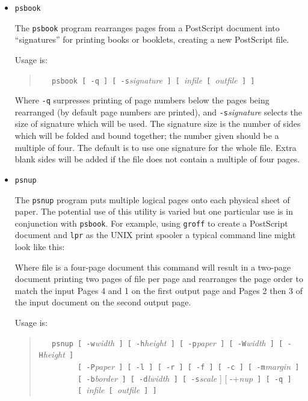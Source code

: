 \documentclass[twoside,11pt]{starlink}
\begin{document}
\begin{itemize}

\item \texttt{psbook}

The \texttt{psbook} program rearranges pages from a PostScript document
into ``signatures'' for printing books or booklets, creating a new
PostScript file.

Usage is:

\begin{quote}
\verb+   psbook [ -q ] [ -s+\emph{signature}\verb+ ] [ +\emph{infile}\verb+ [ +\emph{outfile}\verb+ ] ]+
\end{quote}

Where \texttt{-q} surpresses printing of page numbers below the pages
being rearranged (by default page numbers are printed), and \texttt{-s}\emph{signature} selects the size of signature which will be used.
The signature size is the number of sides which will be folded and
bound together; the number given should be a multiple of four. The
default is to use one signature for the whole file. Extra blank sides
will be added if the file does not contain a multiple of four pages.

\item \texttt{psnup}

The \texttt{psnup} program puts multiple logical pages onto each physical
sheet of paper. The potential use of this utility is varied but one
particular use is in conjunction with \texttt{psbook}. For example, using
\texttt{groff} to create a PostScript document and \texttt{lpr} as the UNIX
print spooler a typical command line might look like this:

\begin{terminalv}
\end{terminalv}

Where file is a four-page document this command will result in a
two-page document printing two pages of file per page and rearranges
the page order to match the input Pages 4 and 1 on the first output
page and Pages 2 then 3 of the input document on the second output
page.

Usage is:

\begin{quote}
\verb+   psnup [ -w+\emph{width}\verb+ ] [ -h+\emph{height}\verb+ ] [ -p+\emph{paper}\verb+ ] [ -W+\emph{width}\verb+ ] [ -H+\emph{height}\verb+ ]+\\
\verb+         [ -P+\emph{paper}\verb+ ] [ -l ] [ -r ] [ -f ] [ -c ] [ -m+\emph{margin}\verb+ ]+\\
\verb+         [ -b+\emph{border}\verb+ ] [ -d+\emph{lwidth}\verb+ ] [ -s+\emph{scale} ] [ -+\emph{nup}\verb+ ] [ -q ]+\\
\verb+         [ +\emph{infile}\verb+ [ +\emph{outfile}\verb+ ] ]+
\end{quote}


\end{itemize}
\end{document}
